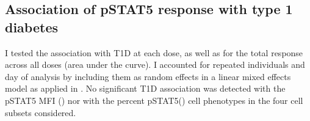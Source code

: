 



\subsection{Association of pSTAT5 response with type 1 diabetes}

I tested the association with T1D at each dose, as well as for the total response across all doses (area under the curve).
I accounted for repeated individuals and day of analysis by including them as random effects in a linear mixed effects model as applied in .
No significant T1D association was detected with the pSTAT5 MFI () nor with the percent pSTAT5\positive () cell phenotypes in the four cell subsets considered.

